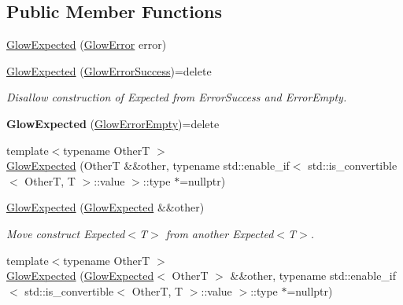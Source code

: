 \subsection*{Public Member Functions}
\begin{DoxyCompactItemize}
\item 
\hyperlink{classglow_1_1detail_1_1_glow_expected_aa21ba9bdd7c064878fd769bee6216712}{Glow\+Expected} (\hyperlink{classglow_1_1detail_1_1_glow_error}{Glow\+Error} error)
\item 
\mbox{\label{classglow_1_1detail_1_1_glow_expected_abd74b8b0b12220c3797100124058c2db}} 
\hyperlink{classglow_1_1detail_1_1_glow_expected_abd74b8b0b12220c3797100124058c2db}{Glow\+Expected} (\hyperlink{classglow_1_1detail_1_1_glow_error_success}{Glow\+Error\+Success})=delete
\begin{DoxyCompactList}\small\item\em Disallow construction of Expected from Error\+Success and Error\+Empty. \end{DoxyCompactList}\item 
\mbox{\label{classglow_1_1detail_1_1_glow_expected_a2953e58ad90e469dd025a98dd9590690}} 
{\bfseries Glow\+Expected} (\hyperlink{classglow_1_1detail_1_1_glow_error_empty}{Glow\+Error\+Empty})=delete
\item 
{\footnotesize template$<$typename OtherT $>$ }\\\hyperlink{classglow_1_1detail_1_1_glow_expected_af574842af6b0354d6a73eaafd4a9eeed}{Glow\+Expected} (OtherT \&\&other, typename std\+::enable\+\_\+if$<$ std\+::is\+\_\+convertible$<$ OtherT, T $>$\+::value $>$\+::type $\ast$=nullptr)
\item 
\mbox{\label{classglow_1_1detail_1_1_glow_expected_a0afaa30b589cf8ffa06f45b333d91828}} 
\hyperlink{classglow_1_1detail_1_1_glow_expected_a0afaa30b589cf8ffa06f45b333d91828}{Glow\+Expected} (\hyperlink{classglow_1_1detail_1_1_glow_expected}{Glow\+Expected} \&\&other)
\begin{DoxyCompactList}\small\item\em Move construct Expected$<$\+T$>$ from another Expected$<$\+T$>$. \end{DoxyCompactList}\item 
{\footnotesize template$<$typename OtherT $>$ }\\\hyperlink{classglow_1_1detail_1_1_glow_expected_adefb9b97647f3b44c5442bf5d9295630}{Glow\+Expected} (\hyperlink{classglow_1_1detail_1_1_glow_expected}{Glow\+Expected}$<$ OtherT $>$ \&\&other, typename std\+::enable\+\_\+if$<$ std\+::is\+\_\+convertible$<$ OtherT, T $>$\+::value $>$\+::type $\ast$=nullptr)

\end{DoxyCompactItemize}

